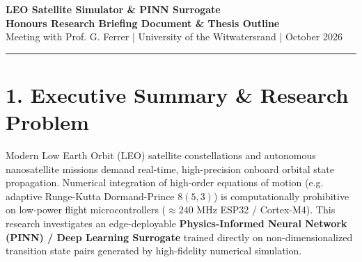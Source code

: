 \documentclass[11pt,a4paper]{article}
\begin{document}
\begin{center}
    {\LARGE \textbf{\textcolor{primary}{LEO Satellite Simulator \& PINN Surrogate}}}\\[6pt]
    {\large \textbf{Honours Research Briefing Document \& Thesis Outline}}\\[4pt]
    {\normalsize Meeting with Prof. G. Ferrer \quad | \quad University of the Witwatersrand \quad | \quad October 2026}
\end{center}

\vspace{-4pt}
\hrule
\vspace{10pt}

\section*{1. Executive Summary \& Research Problem}
Modern Low Earth Orbit (LEO) satellite constellations and autonomous nanosatellite missions demand real-time, high-precision onboard orbital state propagation. Numerical integration of high-order equations of motion (e.g. adaptive Runge-Kutta Dormand-Prince $8(5,3)$) is computationally prohibitive on low-power flight microcontrollers ($\approx 240\text{ MHz}$ ESP32 / Cortex-M4). This research investigates an edge-deployable \textbf{Physics-Informed Neural Network (PINN) / Deep Learning Surrogate} trained directly on non-dimensionalized transition state pairs generated by high-fidelity numerical simulation.
\end{document}
